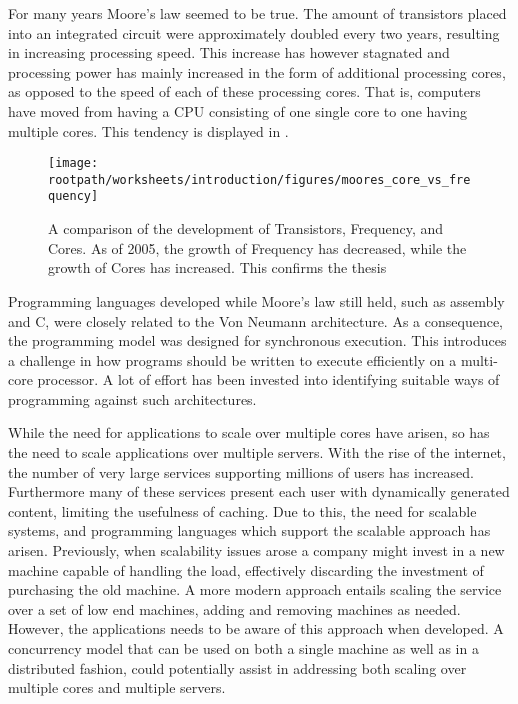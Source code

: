 \makeatletter {}\makeatother
{}\label{chap:introduction}
For many years Moore's law\cite{moore1965cramming} seemed to be true. The amount of transistors placed into an integrated circuit were approximately doubled every two years, resulting in increasing processing speed. This increase has however stagnated and processing power has mainly increased in the form of additional processing cores, as opposed to the speed of each of these processing cores\cite[p. 22]{sevenModels}. That is, computers have moved from having a \ac{CPU} consisting of one single core to one having multiple cores. This tendency is displayed in .

\begin{figure}[htbp]
\centering
 \texttt{[image: \\rootpath/worksheets/introduction/figures/moores\_core\_vs\_frequency]} 
 \caption{A comparison of the development of Transistors, Frequency, and Cores\cite{isca2009}. As of 2005, the growth of Frequency has decreased, while the growth of Cores has increased. This confirms the thesis}
\label{fig:moores_in_reality}
\end{figure}

Programming languages developed while Moore's law still held, such as assembly and C, were closely related to the Von Neumann architecture. As a consequence, the programming model was designed for synchronous execution. This introduces a challenge in how programs should be written to execute efficiently on a multi-core processor. A lot of effort has been invested into identifying suitable ways of programming against such architectures.

While the need for applications to scale over multiple cores have arisen, so has the need to scale applications over multiple servers. With the rise of the internet, the number of very large services supporting millions of users has increased. Furthermore many of these services present each user with dynamically generated content, limiting the usefulness of caching. Due to this, the need for scalable systems, and programming languages which support the scalable approach has arisen. Previously, when scalability issues arose a company might invest in a new machine capable of handling the load, effectively discarding the investment of purchasing the old machine\cite[p. 2]{haller2007actors}. A more modern approach entails scaling the service over a set of low end machines, adding and removing machines as needed. However, the applications needs to be aware of this approach when developed. A concurrency model that can be used on both a single machine as well as in a distributed fashion, could potentially assist in addressing both scaling over multiple cores and multiple servers.

